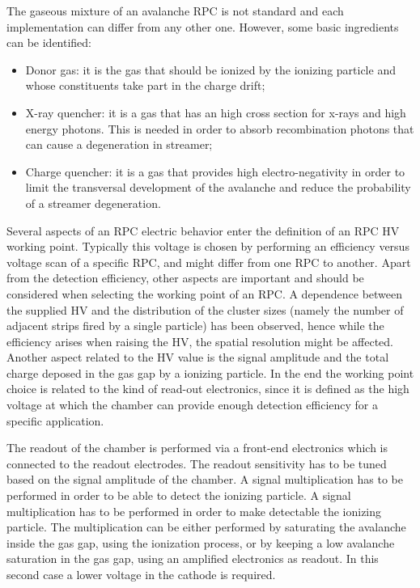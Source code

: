 The gaseous mixture of an avalanche RPC is not standard and each implementation can differ from any other one.
However, some basic ingredients can be identified:
\begin{itemize}
\item Donor gas: it is the gas that should be ionized by the ionizing particle and whose constituents take part in the charge drift;
\item X-ray quencher: it is a gas that has an high cross section for x-rays and high energy photons. This is needed in order to absorb recombination photons that can cause a degeneration in streamer;
\item Charge quencher: it is a gas that provides high electro-negativity in order to limit the transversal development of the avalanche and reduce the probability of a streamer degeneration.
\end{itemize}

Several aspects of an RPC electric behavior enter the definition of an RPC HV working point.
Typically this voltage is chosen by performing an efficiency versus voltage scan of a specific RPC, and might differ from one RPC to another.
Apart from the detection efficiency, other aspects are important and should be considered when selecting the working point of an RPC.
A dependence between the supplied HV and the distribution of the cluster sizes (namely the number of adjacent strips fired by a single particle) has been observed, hence while the efficiency arises when raising the HV, the spatial resolution might be affected.
Another aspect related to the HV value is the signal amplitude and the total charge deposed in the gas gap by a ionizing particle.
In the end the working point choice is related to the kind of read-out electronics, since it is defined as the high voltage at which the chamber can provide enough detection efficiency for a specific application.

The readout of the chamber is performed via a front-end electronics which is connected to the readout electrodes.
The readout sensitivity has to be tuned based on the signal amplitude of the chamber.
A signal multiplication has to be performed in order to be able to detect the ionizing particle.
A signal multiplication has to be performed in order to make detectable the ionizing particle.
The multiplication can be either performed by saturating the avalanche inside the gas gap, using the ionization process, or by keeping a low avalanche saturation in the gas gap, using an amplified electronics as readout.
In this second case a lower voltage in the cathode is required.

